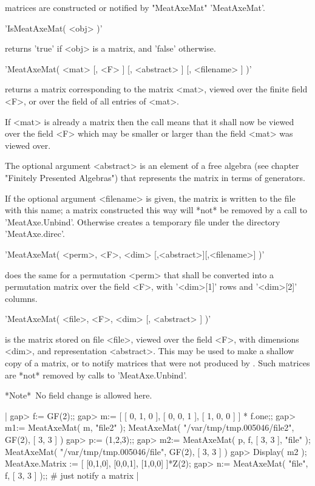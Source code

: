 {\MeatAxe} matrices are constructed or notified by "MeatAxeMat" 'MeatAxeMat'.

\vspace{5mm}

'IsMeatAxeMat( <obj> )'

returns 'true' if <obj> is a {\MeatAxe} matrix, and 'false' otherwise.


'MeatAxeMat( <mat> [, <F> ] [, <abstract> ] [, <filename> ] )'

returns a {\MeatAxe} matrix corresponding to the matrix <mat>, viewed over
the finite field <F>, or over the field of all entries of <mat>.

If <mat> is already a {\MeatAxe} matrix then the call means that it
shall now be viewed over the field <F> which may be smaller or larger
than the field <mat> was viewed over.

The optional argument <abstract> is an element of a free algebra
(see chapter "Finitely Presented Algebras") that represents the matrix
in terms of generators.

If the optional argument <filename> is given, the {\MeatAxe} matrix is
written to the file with this name; a matrix constructed this way will
*not* be removed by a call to 'MeatAxe.Unbind'.  Otherwise {\GAP} creates
a temporary file under the directory 'MeatAxe.direc'.

\vspace{5mm}

'MeatAxeMat( <perm>, <F>, <dim> [,<abstract>][,<filename>] )'

does the same for a permutation <perm> that shall be converted into
a permutation matrix over the field <F>, with '<dim>[1]' rows and
'<dim>[2]' columns.

\vspace{5mm}

'MeatAxeMat( <file>, <F>, <dim> [, <abstract> ] )'

is the {\MeatAxe} matrix stored on file <file>, viewed over the field
<F>, with dimensions <dim>, and representation <abstract>.
This may be used to make a shallow copy of a {\MeatAxe} matrix, or to
notify {\MeatAxe} matrices that were not produced by {\GAP}.
Such matrices are *not* removed by calls to 'MeatAxe.Unbind'.

*Note*\:\ No field change is allowed here.

|    gap> f:= GF(2);;
    gap> m:= [ [ 0, 1, 0 ], [ 0, 0, 1 ], [ 1, 0, 0 ] ] * f.one;;
    gap> m1:= MeatAxeMat( m, "file2" );
    MeatAxeMat( "/var/tmp/tmp.005046/file2", GF(2), [ 3, 3 ] )
    gap> p:= (1,2,3);;
    gap> m2:= MeatAxeMat( p, f, [ 3, 3 ], "file" );
    MeatAxeMat( "/var/tmp/tmp.005046/file", GF(2), [ 3, 3 ] )
    gap> Display( m2 );
    MeatAxe.Matrix := [
    [0,1,0],
    [0,0,1],
    [1,0,0]
    ]*Z(2);
    gap> n:= MeatAxeMat( "file", f, [ 3, 3 ] );; # just notify a matrix |

